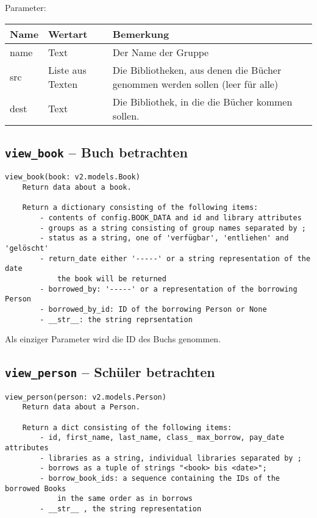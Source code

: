 Parameter:

\begin{tabular}{|p{}|p{}|p{}|}
Name & Wertart & Bemerkung\\
\hline
name & Text & Der Name der Gruppe \\
src & Liste aus Texten & Die Bibliotheken, aus denen die Bücher genommen werden sollen (leer für alle) \\
dest & Text & Die Bibliothek, in die die Bücher kommen sollen.
\end{tabular}

\subsection{\texttt{view\_book} -- Buch betrachten}
\label{subsec:command_list:view_book}

\begin{verbatim}
view_book(book: v2.models.Book)
    Return data about a book.

    Return a dictionary consisting of the following items:
        - contents of config.BOOK_DATA and id and library attributes
        - groups as a string consisting of group names separated by ;
        - status as a string, one of 'verfügbar', 'entliehen' and 'gelöscht'
        - return_date either '-----' or a string representation of the date
            the book will be returned
        - borrowed_by: '-----' or a representation of the borrowing Person
        - borrowed_by_id: ID of the borrowing Person or None
        - __str__: the string reprsentation
\end{verbatim}

Als einziger Parameter wird die ID des Buchs genommen.

\subsection{\texttt{view\_person} -- Schüler betrachten}
\label{subsec:command_list:view_person}

\begin{verbatim}
view_person(person: v2.models.Person)
    Return data about a Person.

    Return a dict consisting of the following items:
        - id, first_name, last_name, class_ max_borrow, pay_date attributes
        - libraries as a string, individual libraries separated by ;
        - borrows as a tuple of strings "<book> bis <date>";
        - borrow_book_ids: a sequence containing the IDs of the borrowed Books
            in the same order as in borrows
        - __str__ , the string representation
\end{verbatim}

